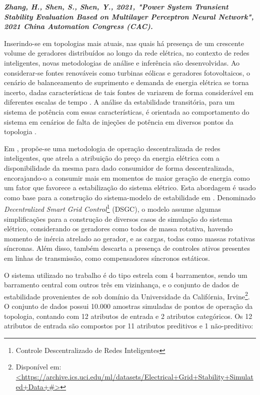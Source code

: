 \documentclass[12pt,oneside,a4paper,chapter=TITLE,section=TITLE,sumario=tradicional,english,brazil]{abntex2}
\begin{document}
\textbf{\textit{Zhang, H., Shen, S., Shen, Y., 2021, "Power System Transient Stability Evaluation Based on Multilayer Perceptron Neural Network", 2021 China Automation Congress (CAC).}}\par
	Inserindo-se em topologias mais atuais, nas quais há presença de um crescente volume de geradores distribuídos ao longo da rede elétrica, no contexto de redes inteligentes, novas metodologias de análise e inferência são desenvolvidas. Ao considerar-se fontes renováveis como turbinas eólicas e geradores fotovoltaicos, o cenário de balanceamento de suprimento e demanda de energia elétrica se torna incerto, dadas características de tais fontes de variarem de forma considerável em diferentes escalas de tempo \cite{schafer2015}. A análise da estabilidade transitória, para um sistema de potência com essas características, é orientada ao comportamento do sistema em cenários de falta de injeções de potência em diversos pontos da topologia \cite{schafer2015}. \par
	Em \textcite{schafer2015}, propõe-se uma metodologia de operação descentralizada de redes  inteligentes, que atrela a atribuição do preço da energia elétrica com a disponibilidade da mesma para dado consumidor de forma descentralizada, encorajando-o a consumir mais em momentos de maior geração de energia como um fator que favorece a estabilização do sistema elétrico. Esta abordagem é usado como base para a construção do sistema-modelo de estabilidade em \cite{arzamasov2018}. Denominado \textit{Decentralized Smart Grid Control}\footnote{Controle Descentralizado de Redes Inteligentes} (DSGC), o modelo assume algumas simplificações para a construção de diversos casos de simulação do sistema elétrico, considerando os geradores como todos de massa rotativa, havendo momento de inércia atrelado ao gerador, e as cargas, todas como massas rotativas síncronas. Além disso, também descarta a presença de controles ativos presentes em linhas de transmissão, como compensadores síncronos estáticos. \par
	O sistema utilizado no trabalho é do tipo estrela com 4 barramentos, sendo um barramento central com outros três em vizinhança, e o conjunto de dados de estabilidade provenientes de \textcite{arzamasov2018} sob domínio da Universidade da Califórnia, Irvine\footnote{Disponível em: \url{<https://archive.ics.uci.edu/ml/datasets/Electrical+Grid+Stability+Simulated+Data+\#>}}. O conjunto de dados possui 10.000 amostras simuladas de pontos de operação da topologia, contando com 12 atributos de entrada e 2 atributos categóricos. Os 12 atributos de entrada são compostos por 11 atributos preditivos e 1 não-preditivo:\par
\end{document}
